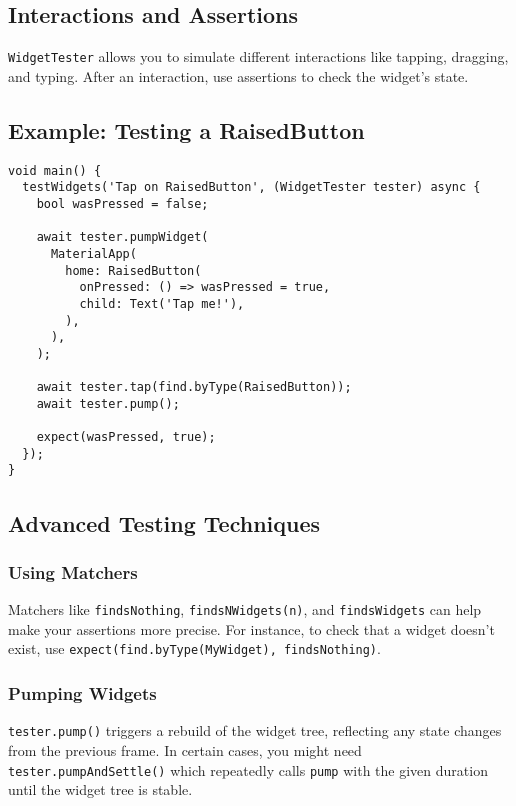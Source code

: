\documentclass[
]{article}
\begin{document}
\subsection{Interactions and
Assertions}\label{interactions-and-assertions}

\texttt{WidgetTester} allows you to simulate different interactions like
tapping, dragging, and typing. After an interaction, use assertions to
check the widget's state.

\subsection{Example: Testing a
RaisedButton}\label{example-testing-a-raisedbutton}

\begin{verbatim}
void main() {
  testWidgets('Tap on RaisedButton', (WidgetTester tester) async {
    bool wasPressed = false;

    await tester.pumpWidget(
      MaterialApp(
        home: RaisedButton(
          onPressed: () => wasPressed = true,
          child: Text('Tap me!'),
        ),
      ),
    );

    await tester.tap(find.byType(RaisedButton));
    await tester.pump();

    expect(wasPressed, true);
  });
}
\end{verbatim}

\subsection{Advanced Testing
Techniques}\label{advanced-testing-techniques}

\subsubsection{Using Matchers}\label{using-matchers}

Matchers like \texttt{findsNothing}, \texttt{findsNWidgets(n)}, and
\texttt{findsWidgets} can help make your assertions more precise. For
instance, to check that a widget doesn't exist, use
\texttt{expect(find.byType(MyWidget),\ findsNothing)}.

\subsubsection{Pumping Widgets}\label{pumping-widgets}

\texttt{tester.pump()} triggers a rebuild of the widget tree, reflecting
any state changes from the previous frame. In certain cases, you might
need \texttt{tester.pumpAndSettle()} which repeatedly calls
\texttt{pump} with the given duration until the widget tree is stable.
\end{document}
